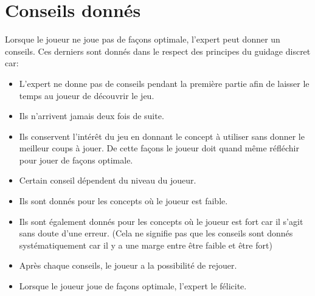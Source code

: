 \documentclass[a4paper, 12pt]{article}
\begin{document}
\section{Conseils donnés}
Lorsque le joueur ne joue pas de façons optimale, l'expert peut donner un conseils.
Ces derniers sont donnés dans le respect des principes du guidage discret car:
\begin{itemize}
	\item L'expert ne donne pas de conseils pendant la première partie afin de laisser le temps au joueur de découvrir le jeu.
	\item Ils n'arrivent jamais deux fois de suite.
	\item Ils conservent l'intérêt du jeu en donnant le concept à utiliser sans donner le meilleur coups à jouer. De cette façons le joueur doit quand même réfléchir pour jouer de façons optimale.
	\item Certain conseil dépendent du niveau du joueur.
	\item Ils sont donnés pour les concepts où le joueur est faible.
	\item Ils sont également donnés pour les concepts où le joueur est fort car il s'agit sans doute d'une erreur. (Cela ne signifie pas que les conseils sont donnés systématiquement car il y a une marge entre être faible et être fort)
	\item Après chaque conseils, le joueur a la possibilité de rejouer.
	\item Lorsque le joueur joue de façons optimale, l'expert le félicite.
\end{itemize}
\end{document}
